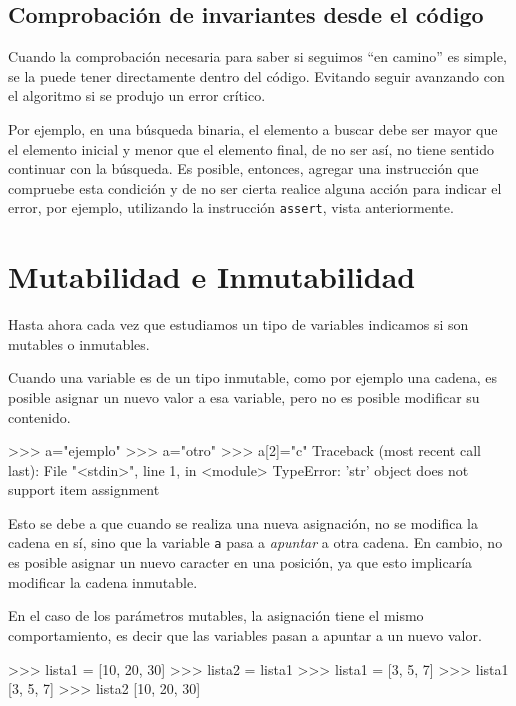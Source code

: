 \subsection{Comprobación de invariantes desde el código}

Cuando la comprobación necesaria para saber si seguimos ``en camino'' es simple,
se la puede tener directamente dentro del código.  Evitando seguir avanzando
con el algoritmo si se produjo un error crítico.

Por ejemplo, en una búsqueda binaria, el elemento a buscar debe ser mayor que
el elemento inicial y menor que el elemento final, de no ser así, no tiene sentido
continuar con la búsqueda.  Es posible, entonces, agregar una instrucción
que compruebe esta condición y de no ser cierta realice alguna acción para
indicar el error, por ejemplo, utilizando la instrucción \lstinline!assert!,
vista anteriormente.

\section{Mutabilidad e Inmutabilidad}

Hasta ahora cada vez que estudiamos un tipo de variables indicamos si son
mutables o inmutables.

Cuando una variable es de un tipo inmutable, como por ejemplo una cadena, es
posible asignar un nuevo valor a esa variable, pero no es posible modificar su
contenido.

\begin{codigo-python-sn}
>>> a="ejemplo"
>>> a="otro"
>>> a[2]="c"
Traceback (most recent call last):
  File "<stdin>", line 1, in <module>
TypeError: 'str' object does not support item assignment
\end{codigo-python-sn}

Esto se debe a que cuando se realiza una nueva asignación, no se modifica la
cadena en sí, sino que la variable \lstinline!a! pasa a \emph{apuntar} a otra cadena.
En cambio, no es posible asignar un nuevo caracter en una posición, ya que
esto implicaría modificar la cadena inmutable.

En el caso de los parámetros mutables, la asignación tiene el mismo
comportamiento, es decir que las variables pasan a apuntar a un nuevo valor.

\begin{codigo-python-sn}
>>> lista1 = [10, 20, 30]
>>> lista2 = lista1
>>> lista1 = [3, 5, 7]
>>> lista1
[3, 5, 7]
>>> lista2
[10, 20, 30]
\end{codigo-python-sn}

